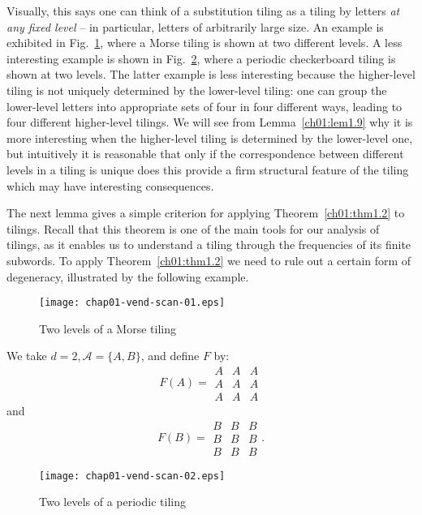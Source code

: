 \documentclass[reqno]{stml-l}
\theoremstyle{plain}
\theoremstyle{definition}
\numberwithin{equation}{chapter}
\begin{document}
Visually, this says one can think of a substitution tiling as a tiling by letters \emph{at any fixed level} -- in particular, letters of arbitrarily large size. An example is exhibited in Fig.~\ref{ch01:fig14}, where a Morse tiling is shown at two different levels. A less interesting example is shown in Fig.~\ref{ch01:fig15}, where a periodic checkerboard tiling is shown at two levels. The latter example is less interesting because the higher-level tiling is not uniquely determined by the lower-level tiling: one can group the lower-level letters into appropriate sets of four in four different ways, leading to four different higher-level tilings. We will see from Lemma~\ref{ch01:lem1.9} why it is more interesting when the higher-level tiling is determined by the lower-level one, but intuitively it is reasonable that only if the correspondence between different levels in a tiling is unique does this provide a firm structural feature of the tiling which may have interesting consequences.

The next lemma gives a simple criterion for applying Theorem~\ref{ch01:thm1.2} to tilings. Recall that this theorem is one of the main tools for our analysis of tilings, as it enables us to understand a tiling through the frequencies of its finite subwords. To apply Theorem~\ref{ch01:thm1.2} we need
to rule out a certain form of degeneracy, illustrated by the following example.

\begin{figure}[!h]
\texttt{[image: chap01-vend-scan-01.eps]}
\caption{Two levels of a Morse tiling}\label{ch01:fig14}
\end{figure}

We take $d=2,\mathcal{A}=\{A, B\}$, and define $F$ by:
\begin{equation}\label{ch01:eqn1.13}
F(A)=\begin{matrix}
A & A & A \\
A & A & A \\
A & A & A  \end{matrix}
\end{equation}
and
\begin{equation}
F(B)=\begin{matrix}
B & B & B \\ B & B & B \\ B & B & B
\end{matrix}. \label{ch01:eqn1.14}
\end{equation}

\begin{figure}[!h]
\texttt{[image: chap01-vend-scan-02.eps]}
\caption{Two levels of a periodic tiling}\label{ch01:fig15}
\end{figure}
\end{document}
